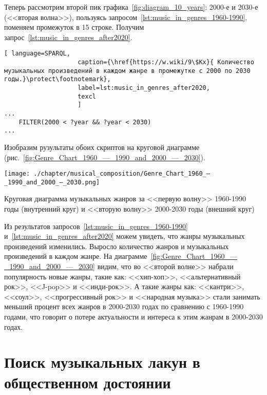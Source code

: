 \newpage
Теперь рассмотрим второй пик графика~\ref{fig:diagram_10_years}: 2000-е и 2030-е (<<вторая волна>>), пользуясь запросом~\ref{lst:music_in_genres_1960-1990}, поменяем промежуток в 15 строке. Получим запрос~\ref{lst:music_in_genres_after2020}.

\begin{lstlisting}[ language=SPARQL,
                    caption={\href{https://w.wiki/9\$Kx}{ Количество музыкальных произведений в каждом жанре в промежутке с 2000 по 2030 годы.}\protect\footnotemark},
                    label=lst:music_in_genres_after2020,
                    texcl 
                    ]
...
    FILTER(2000 < ?year && ?year < 2030)
...
\end{lstlisting}%

Изобразим рузультаты обоих скриптов на круговой диаграмме (рис.~\ref{fig:Genre_Chart_1960_—_1990_and_2000_—_2030}).

\begin{marginfigure}[0\baselineskip]
	\texttt{[image: ./chapter/musical\_composition/Genre\_Chart\_1960\_—\_1990\_and\_2000\_—\_2030.png]}
	\caption{Круговая диаграмма музыкальных жанров за <<первую волну>> 1960-1990 годы (внутренний круг) и <<вторую волну>> 2000-2030 годы (внешний круг)}%
	\label{fig:Genre_Chart_1960_—_1990_and_2000_—_2030}%
\end{marginfigure}

Из результатов запросов~\ref{lst:music_in_genres_1960-1990} 
и~\ref{lst:music_in_genres_after2020} можем увидеть, что жанры музыкальных произведений изменились.
Выросло количество жанров и музыкальных произведений в каждом жанре. 
На диаграмме~\ref{fig:Genre_Chart_1960_—_1990_and_2000_—_2030} видим, что во <<второй волне>> набрали популярность новые жанры, такие как: <<хип-хоп>>, <<альтернативный рок>>, <<J-pop>> и <<инди-рок>>. А такие жанры как: <<кантри>>, <<соул>>, <<прогрессивный рок>> и <<народная музыка>> стали занимать меньший процент всех жанров в 2000-2030 годах по сравнению с 1960-1990 годами, что говорит о потере актуальности и интереса к этим жанрам в 2000-2030 годах.




\newpage
\section{Поиск музыкальных лакун в общественном достоянии}

